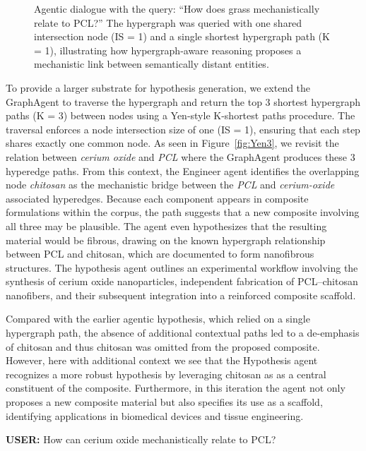 \documentclass{article}
\begin{document}
\begin{figure}[htbp]
\centering
\small
\caption{Agentic dialogue with the query: “How does grass mechanistically relate to PCL?” The hypergraph was queried with one shared intersection node (IS = 1) and a single shortest hypergraph path (K = 1), illustrating how hypergraph-aware reasoning proposes a mechanistic link between semantically distant entities.}
\label{fig:grass}
\end{figure}


To provide a larger substrate for hypothesis generation, we extend the GraphAgent to traverse the hypergraph and return the top 3 shortest hypergraph paths (K = 3) between nodes using a Yen-style K-shortest paths procedure. The traversal enforces a node intersection size of one (IS = 1), ensuring that each step shares exactly one common node. As seen in Figure~\ref{fig:Yen3}, we revisit the relation between \textit{cerium oxide} and \textit{PCL} where the GraphAgent produces these 3 hyperedge paths. From this context, the Engineer agent identifies the overlapping node \textit{chitosan} as the mechanistic bridge between the \textit{PCL} and \textit{cerium-oxide} associated hyperedges. Because each component appears in composite formulations within the corpus, the path suggests that a new composite involving all three may be plausible. The agent even hypothesizes that the resulting material would be fibrous, drawing on the known hypergraph relationship between PCL and chitosan, which are documented to form nanofibrous structures. The hypothesis agent outlines an experimental workflow involving the synthesis of cerium oxide nanoparticles, independent fabrication of PCL–chitosan nanofibers, and their subsequent integration into a reinforced composite scaffold. 

Compared with the earlier agentic hypothesis, which relied on a single hypergraph path, the absence of additional contextual paths led to a de-emphasis of chitosan and thus chitosan was omitted from the proposed composite. However, here with additional context we see that the Hypothesis agent recognizes a more robust hypothesis by leveraging chitosan as as a central constituent of the composite. Furthermore, in this iteration the agent not only proposes a new composite material but also specifies its use as a scaffold, identifying applications in biomedical devices and tissue engineering. 


\begin{rightbubbles}
\textbf{USER:} How can cerium oxide mechanistically relate to PCL? 
\end{rightbubbles}
\end{document}
